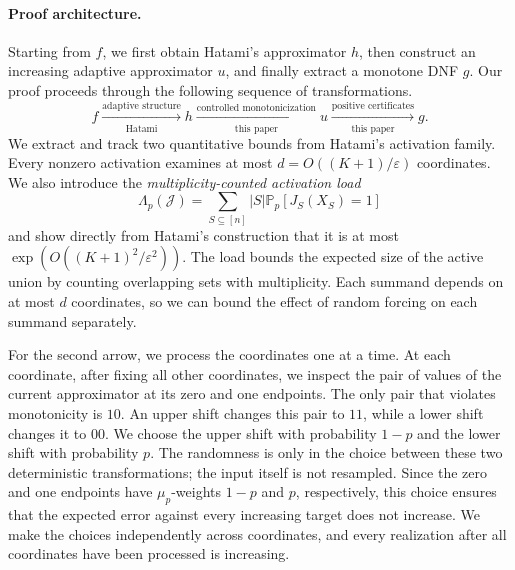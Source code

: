 \documentclass[11pt,letterpaper]{article}
\theoremstyle{definition}
\theoremstyle{remark}
\renewcommand{\Pr}{\mathbb P}
\newcommand{\cJ}{\mathcal J}
\begin{document}
\paragraph{Proof architecture.}
Starting from $f$, we first obtain Hatami's approximator $h$, then construct an
increasing adaptive approximator $u$, and finally extract a monotone DNF $g$.
Our proof proceeds through the following sequence of transformations.
\[
  f
  \xrightarrow[\text{Hatami}]{\text{adaptive structure}}
  h
  \xrightarrow[\text{this paper}]{\text{controlled monotonicization}}
  u
  \xrightarrow[\text{this paper}]{\text{positive certificates}}
  g.
\]
We extract and track two quantitative bounds from Hatami's activation family.
Every nonzero activation examines at most
$d=O((K+1)/\varepsilon)$ coordinates.  We also
introduce the \emph{multiplicity-counted activation load}
\begin{equation}
\label{eq:intro-load}
  \Lambda_p(\cJ)
  =\sum_{S\subseteq[n]}|S|\Pr_p[J_S(X_S)=1]
\end{equation}
and show directly from Hatami's construction that it is at most
$\exp(O((K+1)^2/\varepsilon^2))$.  The load bounds the expected size of the
active union by counting overlapping sets with multiplicity.  Each summand
depends on at most $d$ coordinates, so we can bound the effect of random
forcing on each summand separately.

For the second arrow, we process the coordinates one at a time.  At each
coordinate, after fixing all other coordinates, we inspect the pair of values
of the current approximator at its zero and one endpoints.  The only pair that
violates monotonicity is $10$.  An upper shift changes this pair to $11$, while
a lower shift changes it to $00$.  We choose the upper shift with probability
$1-p$ and the lower shift with probability $p$.  The randomness is only in the
choice between these two deterministic transformations; the input itself is
not resampled.  Since the zero and one endpoints have $\mu_p$-weights $1-p$
and $p$, respectively, this choice ensures that the expected error against
every increasing target does not increase.  We make the choices independently
across coordinates, and every realization after all coordinates have been
processed is increasing.
\end{document}
